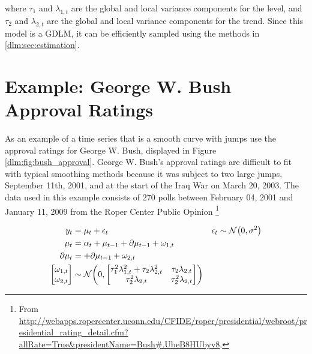 \documentclass[12pt]{article}
\begin{document}
where $\tau_{1}$ and $\lambda_{1,t}$ are the global and local variance components for the level, and $\tau_{2}$ and $\lambda_{2,t}$ are the global and local variance components for the trend.
Since this model is a GDLM, it can be efficiently sampled using the methods in \ref{dlm:sec:estimation}.


\section{Example: George W. Bush Approval Ratings}
\label{dlm:sec:george-w.-bush}

As an example of a time series that is a smooth curve with jumps \textcite{RatkovicEng2010} use the approval ratings for George W. Bush, displayed in Figure \ref{dlm:fig:bush_approval}.
George W. Bush's approval ratings are difficult to fit with typical smoothing methods because it was subject to two large jumps, September 11th, 2001, and at the start of the Iraq War on March 20, 2003.
The data used in this example consists of 270 polls between February 04, 2001 and January 11, 2009 from the Roper Center Public Opinion \footnote{From \url{http://webapps.ropercenter.uconn.edu/CFIDE/roper/presidential/webroot/presidential_rating_detail.cfm?allRate=True\&presidentName=Bush\#.UbeB8HUbyv8}.}

\begin{equation}
  \label{dlm:eq:30}
  \begin{aligned}[t]
    y_{t} &= \mu_{t} + \epsilon_{t} & \epsilon_{t} & \sim \mathcal{N}\mathopen{}\left(0, \sigma^{2}\right)\mathclose{} \\
    \mu_{t} &= \alpha_{t} +  \mu_{t - 1} + \partial \mu_{t - 1} + \omega_{1, t} \\
    \partial \mu_{t} &= + \partial \mu_{t - 1} + \omega_{2, t} \\
    \begin{bmatrix}
      \omega_{1, t} \\
      \omega_{2, t}
    \end{bmatrix} &
                    \sim \mathcal{N}\mathopen{}\left(0,
                    \begin{bmatrix}
                      \tau_{1}^{2} \lambda_{1, t}^{2} + \tau_{2} \lambda_{2, t}^{2} & \tau_{2} \lambda_{2, t} \\
                      \tau_{2}^{2} \lambda_{2, t} & \tau_{2}^{2} \lambda_{2, t}
                    \end{bmatrix}
                    \right)\mathclose{}
  \end{aligned}
\end{equation}
\end{document}
